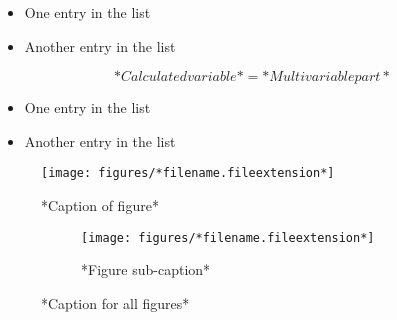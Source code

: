 \begin{itemize}
  \item One entry in the list
  \item Another entry in the list
\end{itemize}


\begin{equation}
    \label{Eq_*Abbreviated Capter*_*Calculated Variable Name*}
    *Calculated variable*=*Multi variable part*
\end{equation}




\begin{itemize}
  \item One entry in the list
  \item Another entry in the list
\end{itemize}







\begin{figure}[h!]
    \centering
    \texttt{[image: figures/*filename.fileextension*]}
    \caption{*Caption of figure*}
    \label{Fig_*Abbreviated Capter*_*Abbreviated caption*}
\end{figure}


\begin{figure}[h!]
\begin{subfigure}[b]{0.5\textwidth}
    \centering
    \texttt{[image: figures/*filename.fileextension*]}
    \caption{*Figure sub-caption*}
    \label{SubFig_*Abbreviated Capter*_*Abbreviated sub-caption*}
\end{subfigure}
\caption{*Caption for all figures*}
\label{Fig_*Abbreviated Capter*_*Abbreviated caption*}
\end{figure}

